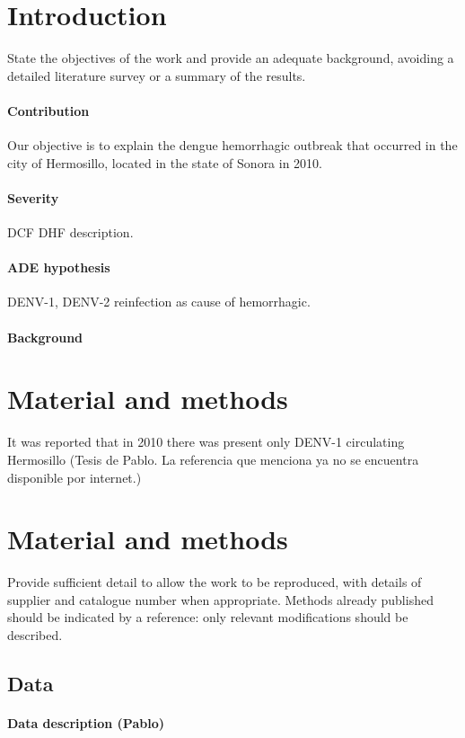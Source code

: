 \documentclass[draft, openbib]{imammb}
\numberwithin{equation}{section}
\begin{document}
    \section{Introduction} \label{intro}
        State the objectives of the work and provide an adequate 
        background, avoiding a detailed literature survey or a 
        summary of the results.
%
        \paragraph{Contribution}
        Our objective is to explain the dengue hemorrhagic outbreak that 
     occurred in the city of Hermosillo, located in the state of Sonora in 2010.
    \paragraph{Severity}
    \ac{DCF} 
    \ac{DHF} description.
    \paragraph{ADE hypothesis}
     \ac{DENV-1}, \ac{DENV-2}
     reinfection as cause of hemorrhagic.
        \paragraph{Background}
        
    \section{Material and methods}

            It was reported that in 2010 there was present only DENV-1 circulating
        Hermosillo (Tesis de Pablo. La referencia que menciona ya no se encuentra
        disponible por internet.)  
        \section{Material and methods}
        Provide sufficient detail to allow the work to be 
        reproduced, with details of supplier and catalogue 
        number when appropriate. Methods already published 
        should be indicated by a reference: only relevant 
        modifications should be described.
        \subsection{Data}
            \paragraph{Data description (Pablo)}
\end{document}
